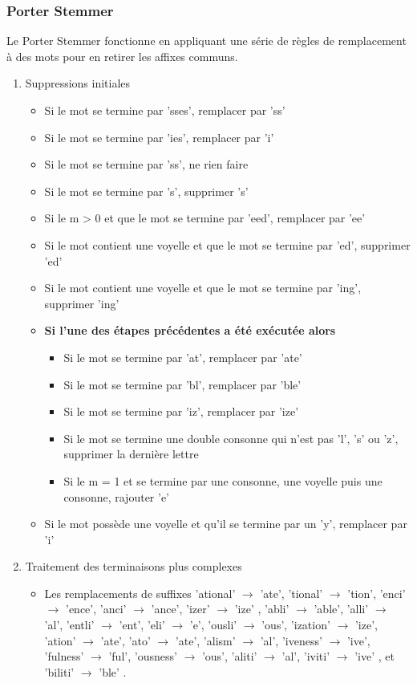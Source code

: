 \documentclass{rapport}
\begin{document}
\subsubsection{Porter Stemmer}
Le Porter Stemmer fonctionne en appliquant une série de règles de remplacement à des mots pour en retirer les affixes communs.
\begin{enumerate}
    \item Suppressions initiales
    \begin{itemize}
        \item Si le mot se termine par 'sses', remplacer par 'ss'
        \item Si le mot se termine par 'ies', remplacer par 'i'
        \item Si le mot se termine par 'ss', ne rien faire
        \item Si le mot se termine par 's', supprimer 's'
        \item Si le m > 0 et que le mot se termine par 'eed', remplacer par 'ee'
        \item Si le mot contient une voyelle et que le mot se termine par 'ed', supprimer 'ed'
        \item Si le mot contient une voyelle et que le mot se termine par 'ing', supprimer 'ing'
        \item \textbf{Si l'une des étapes précédentes a été exécutée alors}
        \begin{itemize}
            \item Si le mot se termine par 'at', remplacer par 'ate'
            \item Si le mot se termine par 'bl', remplacer par 'ble'
            \item Si le mot se termine par 'iz', remplacer par 'ize'
            \item Si le mot se termine une double consonne qui n'est pas 'l', 's' ou 'z', supprimer la dernière lettre
            \item Si le m = 1 et se termine par une consonne, une voyelle puis une consonne, rajouter 'e'
        \end{itemize}
        \item Si le mot possède une voyelle et qu'il se termine par un 'y', remplacer par 'i'
    \end{itemize}
    \item Traitement des terminaisons plus complexes
    \begin{itemize}
        \item Les remplacements de suffixes 'ational' $\rightarrow$ 'ate', 'tional' $\rightarrow$ 'tion', 'enci' $\rightarrow$ 'ence', 'anci' $\rightarrow$ 'ance', 'izer' $\rightarrow$ 'ize' ,  'abli' $\rightarrow$ 'able',  'alli' $\rightarrow$ 'al', 'entli' $\rightarrow$ 'ent',  'eli' $\rightarrow$ 'e', 'ousli' $\rightarrow$ 'ous',  'ization' $\rightarrow$ 'ize', 'ation' $\rightarrow$ 'ate', 'ato' $\rightarrow$ 'ate',  'alism' $\rightarrow$ 'al', 'iveness' $\rightarrow$ 'ive', 'fulness' $\rightarrow$ 'ful', 'ousness' $\rightarrow$ 'ous', 'aliti' $\rightarrow$ 'al',  'iviti' $\rightarrow$ 'ive' , et  'biliti' $\rightarrow$ 'ble' .


\end{itemize}
\end{enumerate}
\end{document}
